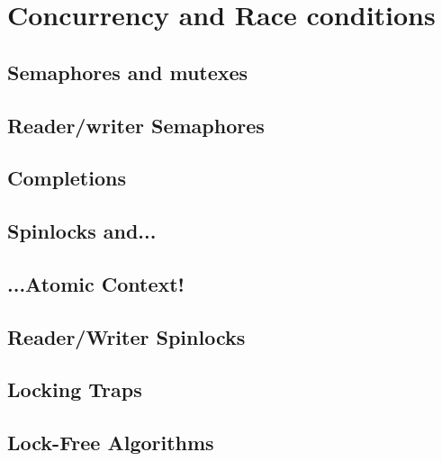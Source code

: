 \documentclass{beamer}
\begin{document}
\section{Concurrency and Race conditions}
\subsection{Semaphores and mutexes}

\subsection{Reader/writer Semaphores}

\subsection{Completions}

\subsection{Spinlocks and...}

\subsection{...Atomic Context!}

\subsection{Reader/Writer Spinlocks}

\subsection{Locking Traps}

\subsection{Lock-Free Algorithms}
\end{document}
